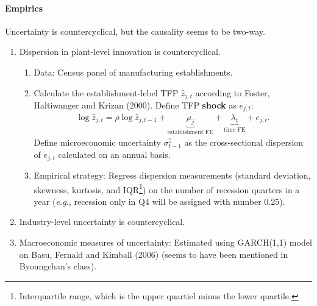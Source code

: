 \documentclass[12pt]{article}
\numberwithin{equation}{section}
\begin{document}
\paragraph{Empirics} Uncertainty is countercyclical, but the causality seems to be two-way.
\begin{enumerate}
    \item Dispersion in plant-level innovation is countercyclical. 
    \begin{enumerate}
        \item Data: Census panel of manufacturing establishments. 
        \item Calculate the establishment-lebel TFP $\hat{z}_{j,t}$ according to Foster, Haltiwanger and Krizan (2000). Define TFP \textbf{shock} as $e_{j,t}$:
        \begin{align*}
            \log \hat{z}_{j,t} = \rho \log \hat{z}_{j,t-1} + \underbrace{\mu_j}_{\text{establishment FE}} + \underbrace{\lambda_t}_{\text{time FE}} + e_{j,t}.
        \end{align*}
        Define microeconomic uncertainty $\sigma^{\hat z}_{t-1}$ as the cross-sectional dispersion of $e_{j,t}$ calculated on an annual basis.
        \item Empirical strategy: Regress dispersion measurements (standard deviation, skewness, kurtosis, and IQR\footnote{Interquartile range, which is the upper quartiel minus the lower quartile.}) on the number of recession quarters in a year (\textit{e.g.}, recession only in Q4 will be assigned with number 0.25).
    \end{enumerate}
    \item Industry-level uncertainty is countercyclical.
    \item Macroeconomic measures of uncertainty: Estimated using GARCH(1,1) model on Basu, Fernald and Kimball (2006) (seems to have been mentioned in Byoungchan's class).
\end{enumerate}




\end{document}
